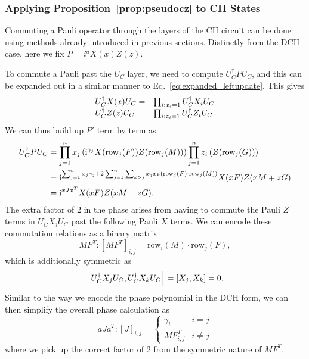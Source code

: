 \subsubsection*{Applying Proposition~\ref{prop:pseudocz} to CH States}
Commuting a Pauli operator through the layers of the CH circuit can be done using methods already introduced in previous sections. Distinctly from the DCH case, here we fix $P=i^{a}X(x)Z(z)$.\par
To commute a Pauli past the $U_{C}$ layer, we need to compute $U_{C}^{\dagger}PU_{C}$, and this can be expanded out in a similar manner to Eq.~\ref{eq:expanded_leftupdate}. This gives
\[
\begin{array}{l l}
U_{C}^{\dagger}X(x)U_{C} = & \prod_{i:x_{i}=1}U_{C}^{\dagger}X_{i}U_{C}\\
U_{C}^{\dagger}Z(z)U_{C} & \prod_{i:z_{i}=1}U_{C}^{\dagger}Z_{i}U_{C}
\end{array}
\]
We can thus build up $P'$ term by term as
\begin{align}
U_{C}^{\dagger}PU_{C} &= \prod_{j=1}^{n}x_{j}\left(\mathrm{i}^{\gamma_{j}}X(\text{row}_{j}(F))Z(\text{row}_{j}(M))\right)\prod_{j=1}^{n}z_{i}\left(Z(\text{row}_{j}(G))\right) \nonumber \\
&= \mathrm{i}^{\sum_{j=1}^{n} x_{j}\gamma_{j} + 2\sum_{j=1}^{n}\sum_{k>j}x_{j}x_{k}\left( \text{row}_{j}(F)\cdot\text{row}_{j}(M) \right)}X(xF)Z(xM+zG) \nonumber \\
&= \mathrm{i}^{xJx^{T}}X(xF)Z(xM+zG).
\label{eq:tableau_update_pauli}
\end{align}
The extra factor of $2$ in the phase arises from having to commute the Pauli $Z$ terms in $U_{C}^{\dagger}X_{j}U_{C}$ past the following Pauli $X$ terms. We can encode these commutation relations as a binary matrix
\[MF^{T} : \left[MF^{T}\right]_{i,j} = \text{row}_{i}(M)\cdot \text{row}_{j}(F),\]
which is additionally symmetric as 
\[\comm{U_{C}^{\dagger}X_{j}U_{C}}{U_{C}^{\dagger}X_{k}U_{C}} = \comm{X_{j}}{X_{k}} = 0.\]
Similar to the way we encode the phase polynomial in the DCH form, we can then simplify the overall phase calculation as
\[aJa^{T} : \left[J\right]_{i,j} = \begin{cases} \gamma_{i} & i=j \\ MF^{T}_{i,j} & i\neq j \end{cases}\]
where we pick up the correct factor of $2$ from the symmetric nature of $MF^{T}$.

